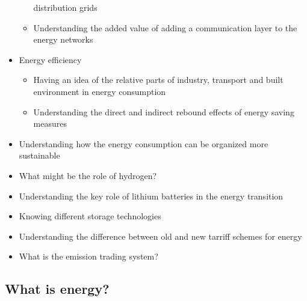 \documentclass[../summary.tex]{subfiles}
\begin{document}
\begin{itemize}
\begin{itemize}
			distribution grids
			\item Understanding the added value of adding a communication layer to the energy networks
		\end{itemize}
		\item Energy efficiency
		\begin{itemize}
			\item Having an idea of the relative parts of industry, transport and built environment in energy consumption
			\item Understanding the direct and indirect rebound effects of energy saving measures
		\end{itemize}
		\item Understanding how the energy consumption can be organized more sustainable
		\item What might be the role of hydrogen?
		\item Understanding the key role of lithium batteries in the energy transition
		\item Knowing different storage technologies
		\item Understanding the difference between old and new tarriff schemes for energy
		\item What is the emission trading system?
	\end{itemize}
	\newpage
	\subsection{What is energy?}
	
\end{document}
